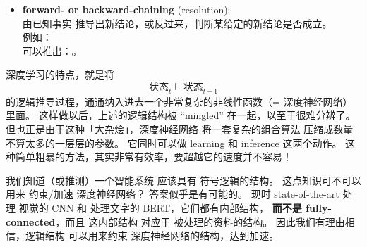 \begin{preview}
\begin{minipage}{\textwidth}
\begin{itemize}
	\item \textbf{forward- or backward-chaining} (resolution): \\
	由已知事实 推导出新结论，或反过来，判断某给定的新结论是否成立。 \\
	例如： \\
	可以推出：。
\end{itemize}

深度学习的特点，就是将
\begin{equation}
\mbox{状态}_t  \vdash \mbox{状态}_{t+1}
\end{equation}
的逻辑推导过程，通通纳入进去一个非常复杂的非线性函数（= 深度神经网络）里面。 这样做以后，上述的逻辑结构被
``mingled'' 在一起，以至于很难分辨了。 但也正是由于这种「大杂烩」，深度神经网络 将一套复杂的组合算法 压缩成数量不算太多的一层层的参数。 它同时可以做 learning 和 inference 这两个动作。 这种简单粗暴的方法，其实非常有效率，要超越它的速度并不容易！

我们知道（或推测）一个智能系统 应该具有 符号逻辑的结构。 这点知识可不可以用来 约束/加速 深度神经网络？ 答案似乎是有可能的。 现时 state-of-the-art 处理 视觉的 CNN 和 处理文字的 BERT，它们都有内部结构， \textbf{而不是 fully-connected}，而且 这内部结构 对应于 被处理的资料的结构。 因此我们有理由相信，逻辑结构 可以用来约束 深度神经网络的结构，达到加速。 

\end{minipage}
\end{preview}

